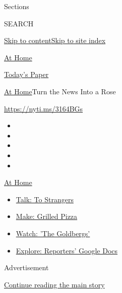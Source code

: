 Sections

SEARCH

\protect\hyperlink{site-content}{Skip to
content}\protect\hyperlink{site-index}{Skip to site index}

\href{https://www.nytimes.com/spotlight/at-home}{At Home}

\href{https://myaccount.nytimes.com/auth/login?response_type=cookie\&client_id=vi}{}

\href{https://www.nytimes.com/section/todayspaper}{Today's Paper}

\href{/spotlight/at-home}{At Home}\textbar{}Turn the News Into a Rose

\url{https://nyti.ms/3164BGs}

\begin{itemize}
\item
\item
\item
\item
\item
\end{itemize}

\href{https://www.nytimes.com/spotlight/at-home?action=click\&pgtype=Article\&state=default\&region=TOP_BANNER\&context=at_home_menu}{At
Home}

\begin{itemize}
\tightlist
\item
  \href{https://www.nytimes.com/2020/08/03/well/family/the-benefits-of-talking-to-strangers.html?action=click\&pgtype=Article\&state=default\&region=TOP_BANNER\&context=at_home_menu}{Talk:
  To Strangers}
\item
  \href{https://www.nytimes.com/2020/08/01/at-home/coronavirus-make-pizza-on-a-grill.html?action=click\&pgtype=Article\&state=default\&region=TOP_BANNER\&context=at_home_menu}{Make:
  Grilled Pizza}
\item
  \href{https://www.nytimes.com/2020/07/31/arts/television/goldbergs-abc-stream.html?action=click\&pgtype=Article\&state=default\&region=TOP_BANNER\&context=at_home_menu}{Watch:
  'The Goldbergs'}
\item
  \href{https://www.nytimes.com/interactive/2020/at-home/even-more-reporters-editors-diaries-lists-recommendations.html?action=click\&pgtype=Article\&state=default\&region=TOP_BANNER\&context=at_home_menu}{Explore:
  Reporters' Google Docs}
\end{itemize}

Advertisement

\protect\hyperlink{after-top}{Continue reading the main story}

